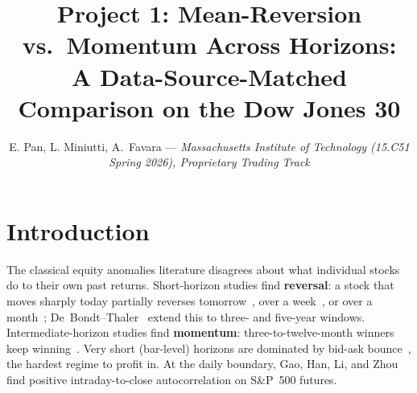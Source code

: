 \documentclass[10pt,conference,compsoc]{IEEEtran}
\title{\large \textbf{Project 1: Mean-Reversion vs.\ Momentum Across Horizons:\\
A Data-Source-Matched Comparison on the Dow Jones 30}\vspace{-0.5em}}
\author{
  \small E. Pan, L. Miniutti, A.\ Favara --- \textit{Massachusetts Institute of Technology
  (15.C51 Spring 2026), Proprietary Trading Track}\vspace{-5em}
}
\begin{document}
\titlespacing*{\section}{0pt}{1.2ex}{0.6ex}
\titlespacing*{\subsection}{0pt}{1.0ex}{0.5ex}
\titlespacing*{\subsubsection}{0pt}{0.8ex}{0.4ex}
\titleformat{\paragraph}[runin]{\normalfont\bfseries}{}{0pt}{}
\titlespacing{\paragraph}{0pt}{0.5ex}{1em}

\maketitle
\setlength{\parskip}{0pt}

\section{Introduction}

The classical equity anomalies literature disagrees about what individual
stocks do to their own past returns. Short-horizon studies find
\textbf{reversal}: a stock that moves sharply today partially reverses
tomorrow~\cite{lehmann1990}, over a week~\cite{lo1990}, or over a
month~\cite{jegadeesh1990}; De~Bondt--Thaler~\cite{dt1985} extend this to
three- and five-year windows. Intermediate-horizon studies find
\textbf{momentum}: three-to-twelve-month winners keep
winning~\cite{jt1993}. Very short (bar-level) horizons are dominated by
bid-ask bounce~\cite{roll1984}, the hardest regime to profit in. At the
daily boundary, Gao, Han, Li, and Zhou~\cite{gao2018} find positive
intraday-to-close autocorrelation on S\&P~500 futures.
\end{document}
